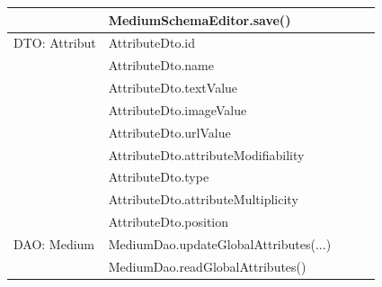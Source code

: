 \documentclass{article}
\begin{document}
\begin{longtable}{|l|l|l|l|l|}
\hline
                                        & MediumSchemaEditor.save()                &                           &                             &                        \\ 
\hline
DTO: Attribut                           & AttributeDto.id                          &                           &                             &                        \\ 
\hline
                                        & AttributeDto.name                        &                           &                             &                        \\ 
\hline
                                        & AttributeDto.textValue                   &                           &                             &                        \\ 
\hline
                                        & AttributeDto.imageValue                  &                           &                             &                        \\ 
\hline
                                        & AttributeDto.urlValue                    &                           &                             &                        \\ 
\hline
                                        & AttributeDto.attributeModifiability      &                           &                             &                        \\ 
\hline
                                        & AttributeDto.type                        &                           &                             &                        \\ 
\hline
                                        & AttributeDto.attributeMultiplicity       &                           &                             &                        \\ 
\hline
                                        & AttributeDto.position                    &                           &                             &                        \\ 
\hline
DAO: Medium                             & MediumDao.updateGlobalAttributes(...)    &                           &                             &                        \\ 
\hline
                                        & MediumDao.readGlobalAttributes()         &                           &                             &                        \\ 

\end{longtable}
\end{document}
